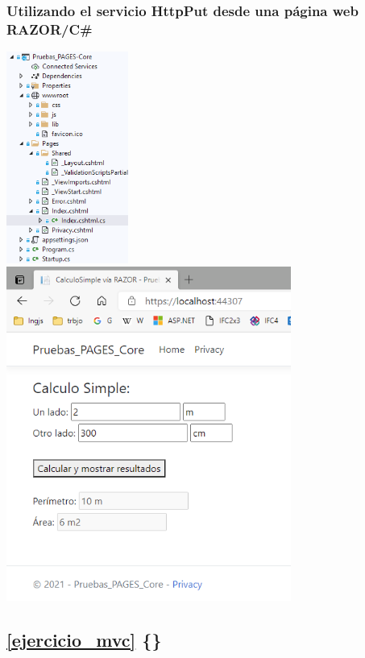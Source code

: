 \documentclass[spanish,12pt,a4paper,final,oneside]{book}
\begin{document}
\subsubsection{Utilizando el servicio HttpPut desde una página web RAZOR/C\#}
\includegraphics[width=0.3\textwidth]{HttpPut_web_Razor_codigo.png} 
\includegraphics[width=0.7\textwidth]{HttpPut_web_Razor_pantallazo.png} 





\vspace{1cm}
\subsection*{\ref{ejercicio_mvc} \{\}}
\end{document}
